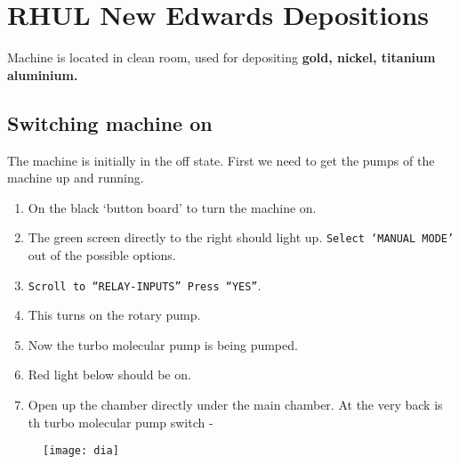 \section{RHUL New Edwards Depositions\label{sec:edwards500}}
  \newcommand{\imedwardsFiveHundred}{\hyperref[sec:edwards500]{\textit{\textbf{\underline{Edwards 500}}}}}
  
  Machine is located in clean room, used for depositing \textbf{gold, nickel, titanium aluminium.} 
  \subsection{Switching machine on}
   The machine is initially in the off state. First we need to get the pumps of the machine up and running.
   \begin{enumerate}
   	\item On the black `button board'  to turn the machine on.
   	\item The green screen directly to the right should light up. \texttt{Select `MANUAL MODE'} out of the possible options.
   	\item \texttt{Scroll to ``RELAY-INPUTS'' \ra Press ``YES''}. 
   	\item {} This turns on the rotary pump.
   	\item {} Now the turbo molecular pump is being pumped.
   	\item {} Red light below  should be on.
   	\item Open up the chamber directly under the main chamber. At the very back is th turbo molecular pump switch -  
   \end{enumerate}

 \begin{figure}[htbp]
 	\centering
 	\texttt{[image: dia]}
 \end{figure}
